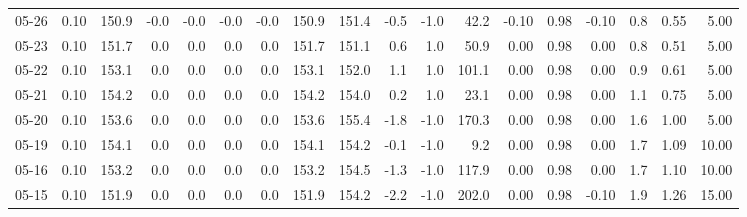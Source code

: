 \begin{threeparttable}
{\begin{tabular}{lrrrrrrrrrrrrrrrrr}
  05-26 &     0.10 & 150.9 &              -0.0 &              -0.0 &               -0.0 &               -0.0 & 150.9 & 151.4 &       -0.5 &                     -1.0 &                42.2 &      -0.10 &      0.98 &          -0.10 &              0.8 &            0.55 &                   5.00 \\
  05-23 &     0.10 & 151.7 &               0.0 &               0.0 &                0.0 &                0.0 & 151.7 & 151.1 &        0.6 &                      1.0 &                50.9 &       0.00 &      0.98 &           0.00 &              0.8 &            0.51 &                   5.00 \\
  05-22 &     0.10 & 153.1 &               0.0 &               0.0 &                0.0 &                0.0 & 153.1 & 152.0 &        1.1 &                      1.0 &               101.1 &       0.00 &      0.98 &           0.00 &              0.9 &            0.61 &                   5.00 \\
  05-21 &     0.10 & 154.2 &               0.0 &               0.0 &                0.0 &                0.0 & 154.2 & 154.0 &        0.2 &                      1.0 &                23.1 &       0.00 &      0.98 &           0.00 &              1.1 &            0.75 &                   5.00 \\
  05-20 &     0.10 & 153.6 &               0.0 &               0.0 &                0.0 &                0.0 & 153.6 & 155.4 &       -1.8 &                     -1.0 &               170.3 &       0.00 &      0.98 &           0.00 &              1.6 &            1.00 &                   5.00 \\
  05-19 &     0.10 & 154.1 &               0.0 &               0.0 &                0.0 &                0.0 & 154.1 & 154.2 &       -0.1 &                     -1.0 &                 9.2 &       0.00 &      0.98 &           0.00 &              1.7 &            1.09 &                  10.00 \\
  05-16 &     0.10 & 153.2 &               0.0 &               0.0 &                0.0 &                0.0 & 153.2 & 154.5 &       -1.3 &                     -1.0 &               117.9 &       0.00 &      0.98 &           0.00 &              1.7 &            1.10 &                  10.00 \\
  05-15 &     0.10 & 151.9 &               0.0 &               0.0 &                0.0 &                0.0 & 151.9 & 154.2 &       -2.2 &                     -1.0 &               202.0 &       0.00 &      0.98 &          -0.10 &              1.9 &            1.26 &                  15.00 \\

\end{tabular}}
\end{threeparttable}
